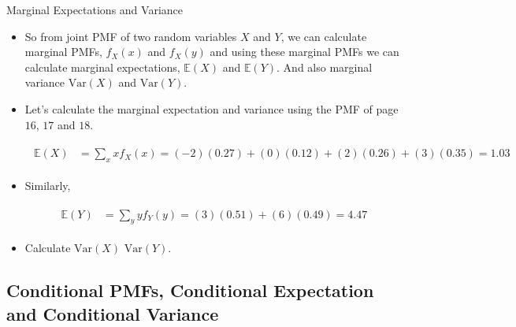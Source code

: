 \documentclass[8pt, usepdftitle=false]{beamer}
\begin{document}
\begin{frame}{Marginal Expectations and Variance}

\begin{itemize}
  \item So from joint PMF of two random variables $X$ and $Y$, we can calculate marginal PMFs, $f_{X}(x)$ and $f_{X}(y)$ and using these marginal PMFs we can calculate marginal expectations, $\mathbb{E}(X)$ and $\mathbb{E}(Y)$. And also marginal variance $\mathrm{Var}(X)$ and $\mathrm{Var}(Y)$.

  \item Let's calculate the marginal expectation and variance using the PMF of page $16$, $17$ and $18$.

  \begin{align*}
  \begin{aligned}
  \mathbb{E}(X) &=\sum_x x f_{X}(x) =(-2)(0.27)+(0)(0.12)+(2)(0.26)+(3)(0.35) =1.03\end{aligned}
  \end{align*}
  
  \item Similarly,
  

\begin{align*}
\begin{aligned}
\mathbb{E}(Y) &=\sum_y y f_{Y}(y)=(3)(0.51)+(6)(0.49) =4.47
\end{aligned}
\end{align*}


\item Calculate $\mathrm{Var}(X)$ $\mathrm{Var}(Y)$.


\end{itemize}


\end{frame}





\subsection{Conditional PMFs, Conditional Expectation and Conditional Variance}
\end{document}
